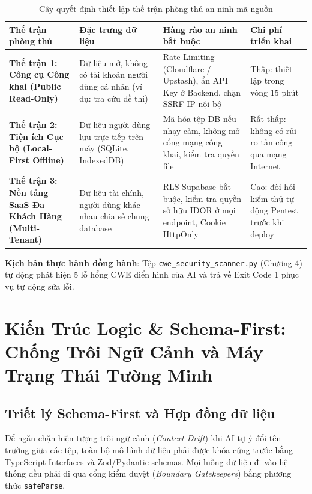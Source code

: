 \documentclass[a4paper,11pt]{report}
\begin{document}
\begin{table}[htbp]
\centering
\small
\caption{Cây quyết định thiết lập thế trận phòng thủ an ninh mã nguồn}
\vspace{0.5em}
\begin{tabularx}{\textwidth}{L{3.2cm} L{3.8cm} L{4.5cm} Y}
\toprule
\textbf{Thế trận phòng thủ} & \textbf{Đặc trưng dữ liệu} & \textbf{Hàng rào an ninh bắt buộc} & \textbf{Chi phí triển khai} \\
\midrule
\textbf{Thế trận 1: Công cụ Công khai (Public Read-Only)} & Dữ liệu mở, không có tài khoản người dùng cá nhân (ví dụ: tra cứu đề thi) & Rate Limiting (Cloudflare / Upstash), ẩn API Key ở Backend, chặn SSRF IP nội bộ & Thấp: thiết lập trong vòng 15 phút \\
\textbf{Thế trận 2: Tiện ích Cục bộ (Local-First Offline)} & Dữ liệu người dùng lưu trực tiếp trên máy (SQLite, IndexedDB) & Mã hóa tệp DB nếu nhạy cảm, không mở cổng mạng công khai, kiểm tra quyền file & Rất thấp: không có rủi ro tấn công qua mạng Internet \\
\textbf{Thế trận 3: Nền tảng SaaS Đa Khách Hàng (Multi-Tenant)} & Dữ liệu tài chính, người dùng khác nhau chia sẻ chung database & RLS Supabase bắt buộc, kiểm tra quyền sở hữu IDOR ở mọi endpoint, Cookie HttpOnly & Cao: đòi hỏi kiểm thử tự động Pentest trước khi deploy \\
\bottomrule
\end{tabularx}
\end{table}

\noindent\textbf{Kịch bản thực hành đồng hành}: Tệp \texttt{cwe\_security\_scanner.py} (Chương 4) tự động phát hiện 5 lỗ hổng CWE điển hình của AI và trả về Exit Code 1 phục vụ tự động sửa lỗi.

\chapter{Kiến Trúc Logic \& Schema-First: Chống Trôi Ngữ Cảnh và Máy Trạng Thái Tường Minh}

\section{Triết lý Schema-First và Hợp đồng dữ liệu}
Để ngăn chặn hiện tượng trôi ngữ cảnh (\textit{Context Drift}) khi AI tự ý đổi tên trường giữa các tệp, toàn bộ mô hình dữ liệu phải được khóa cứng trước bằng TypeScript Interfaces và Zod/Pydantic schemas. Mọi luồng dữ liệu đi vào hệ thống đều phải đi qua cổng kiểm duyệt (\textit{Boundary Gatekeepers}) bằng phương thức \texttt{safeParse}.
\end{document}
